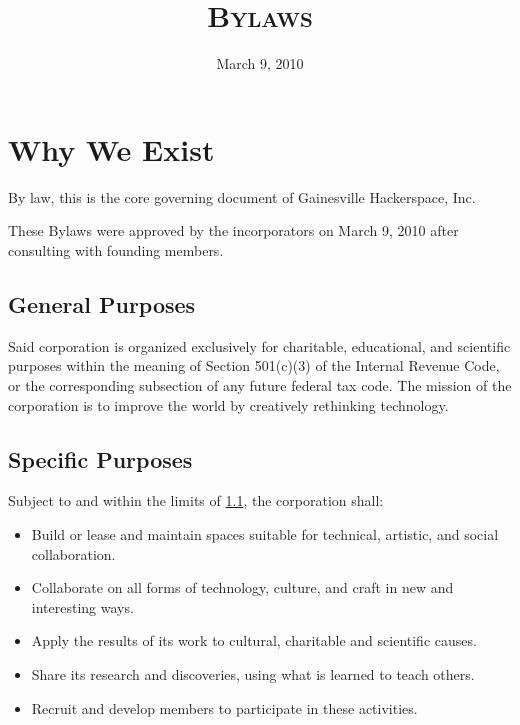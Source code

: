 \documentclass[10pt,letterpaper,titlepage]{article}
\author{}
\title{%
    \textsc{\LARGE \corpname \\
    \Large Bylaws
    }
}
\date{March 9, 2010}
\newcommand\corpname{Gainesville Hackerspace, Inc.}
\newcommand\approvaldate{March 9, 2010}
\begin{document}
\maketitle

\tableofcontents
\newpage

\section{Why We Exist}
\label{whyweexist}

By law, this is the core governing document of \corpname{}

These Bylaws were approved by the incorporators on \approvaldate{} after
consulting with founding members.

\subsection{General Purposes}
\label{genpurp}

Said corporation is organized exclusively for charitable, educational, and
scientific purposes within the meaning of Section 501(c)(3) of the Internal
Revenue Code, or the corresponding subsection of any future federal tax code.
The mission of the corporation is to improve the world by creatively rethinking
technology.

\subsection{Specific Purposes}

Subject to and within the limits of \ref{genpurp}, the corporation shall:
\begin{itemize}
    \item Build or lease and maintain spaces suitable for technical, artistic,
          and social collaboration.

    \item Collaborate on all forms of technology, culture, and craft in new and
          interesting ways.

    \item Apply the results of its work to cultural, charitable and
          scientific causes.

    \item Share its research and discoveries, using what is learned to
          teach others.

    \item Recruit and develop members to participate in these activities.
\end{itemize}
\end{document}

